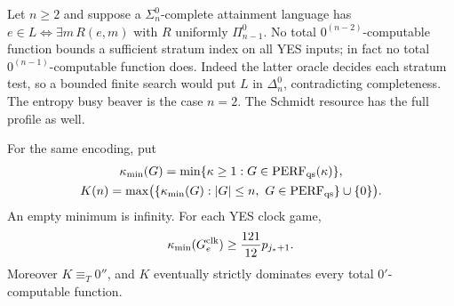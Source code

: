 \begin{remark}
Let $n\ge2$ and suppose a $\Sigma^0_n$-complete attainment language has
$e\in L\iff\exists m\,R(e,m)$ with $R$ uniformly $\Pi^0_{n-1}$.
No total $0^{(n-2)}$-computable function bounds a sufficient stratum index
on all YES inputs; in fact no total $0^{(n-1)}$-computable function does.
Indeed the latter oracle decides each stratum test, so a bounded finite
search would put $L$ in $\Delta^0_n$, contradicting completeness.
The entropy busy beaver is the case $n=2$. The Schmidt resource has the full profile as well.
\end{remark}


\begin{corollary}\label{cor:schmidtbeaver}
For the same encoding, put
\[
 \begin{gathered}
 \kappa_{\min}(G)=\min\{\kappa\ge1:G\in\perf_{\qs}(\kappa)\},\\
 K(n)=\max\bigl(\{\kappa_{\min}(G):|G|\le n,\ G\in\perf_{\qs}\}\cup\{0\}\bigr).
 \end{gathered}
\]
An empty minimum is infinity. For each YES clock game,
\[
 \kappa_{\min}(G^{\rm clk}_e)\ge\frac{121}{12}p_{j_*+1}.
\]
Moreover $K\equiv_T0''$, and $K$ eventually strictly dominates every
total $0'$-computable function.
\end{corollary}
